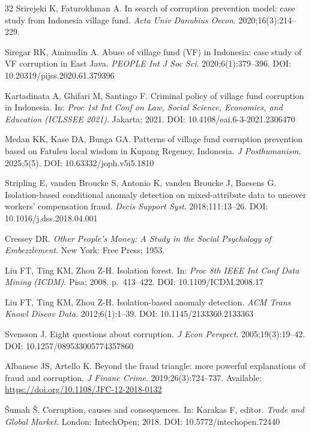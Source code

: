 \documentclass[3p,times,procedia]{elsarticle}
\begin{document}
\begin{thebibliography}{32}
Srirejeki K, Faturokhman A. In search of corruption prevention model: case study from Indonesia village fund. \textit{Acta Univ Danubius Oecon}. 2020;16(3):214--229.

Siregar RK, Aminudin A. Abuse of village fund (VF) in Indonesia: case study of VF corruption in East Java. \textit{PEOPLE Int J Soc Sci}. 2020;6(1):379--396. DOI: 10.20319/pijss.2020.61.379396

Kartadinata A, Ghifari M, Santiago F. Criminal policy of village fund corruption in Indonesia. In: \textit{Proc 1st Int Conf on Law, Social Science, Economics, and Education (ICLSSEE 2021)}. Jakarta; 2021. DOI: 10.4108/eai.6-3-2021.2306470

Medan KK, Kase DA, Bunga GA. Patterns of village fund corruption prevention based on Fatuleu local wisdom in Kupang Regency, Indonesia. \textit{J Posthumanism}. 2025;5(5). DOI: 10.63332/joph.v5i5.1810

Stripling E, vanden Broucke S, Antonio K, vanden Broucke J, Baesens G. Isolation-based conditional anomaly detection on mixed-attribute data to uncover workers' compensation fraud. \textit{Decis Support Syst}. 2018;111:13--26. DOI: 10.1016/j.dss.2018.04.001

Cressey DR. \textit{Other People's Money: A Study in the Social Psychology of Embezzlement}. New York: Free Press; 1953.

Liu FT, Ting KM, Zhou Z-H. Isolation forest. In: \textit{Proc 8th IEEE Int Conf Data Mining (ICDM)}. Pisa; 2008. p.\ 413--422. DOI: 10.1109/ICDM.2008.17

Liu FT, Ting KM, Zhou Z-H. Isolation-based anomaly detection. \textit{ACM Trans Knowl Discov Data}. 2012;6(1):1--39. DOI: 10.1145/2133360.2133363

Svensson J. Eight questions about corruption. \textit{J Econ Perspect}. 2005;19(3):19--42. DOI: 10.1257/089533005774357860

Albanese JS, Artello K. Beyond the fraud triangle: more powerful explanations of fraud and corruption. \textit{J Financ Crime}. 2019;26(3):724--737. Available: \url{https://doi.org/10.1108/JFC-12-2018-0132}

\v{S}umah \v{S}. Corruption, causes and consequences. In: Karakas F, editor. \textit{Trade and Global Market}. London: IntechOpen; 2018. DOI: 10.5772/intechopen.72440


\end{thebibliography}
\end{document}
